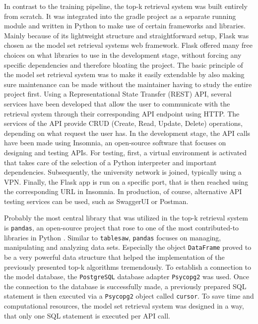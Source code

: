 In contrast to the training pipeline, the top-k retrieval system was built entirely from scratch. It was integrated into the gradle project as a separate running module and written in Python to make use of certain frameworks and libraries. Mainly because of its lightweight structure and straightforward setup, Flask was chosen as the model set retrieval systems web framework. Flask offered many free choices on what libraries to use in the development stage, without forcing any specific dependencies and therefore bloating the project. The basic principle of the model set retrieval system was to make it easily extendable by also making sure maintenance can be made without the maintainer having to study the entire project first. Using a Representational State Transfer (REST) API, several services have been developed that allow the user to communicate with the retrieval system through their corresponding API endpoint using HTTP. The services of the API provide CRUD (Create, Read, Update, Delete) operations, depending on what request the user has. In the development stage, the API calls have been made using Insomnia, an open-source software that focuses on designing and testing APIs. For testing, first, a virtual environment is activated that takes care of the selection of a Python interpreter and important dependencies. Subsequently, the university network is joined, typically using a VPN. Finally, the Flask app is run on a specific port, that is then reached using the corresponding URL in Insomnia. In production, of course, alternative API testing services can be used, such as SwaggerUI or Postman.


Probably the most central library that was utilized in the top-k retrieval system is \texttt{pandas}, an open-source project that rose to one of the most contributed-to libraries in Python \cite{mckinney2022}. Similar to \texttt{tablesaw}, \texttt{pandas} focuses on managing, manipulating and analyzing data sets. Especially the object \texttt{DataFrame} proved to be a very powerful data structure that helped the implementation of the previously presented top-k algorithms tremendously. To establish a connection to the model database, the \texttt{PostgreSQL} database adapter \texttt{Psycopg2} was used. Once the connection to the database is successfully made, a previously prepared SQL statement is then executed via a \texttt{Psycopg2} object called \texttt{cursor}. To save time and computational resources, the model set retrieval system was designed in a way, that only one SQL statement is executed per API call. 

